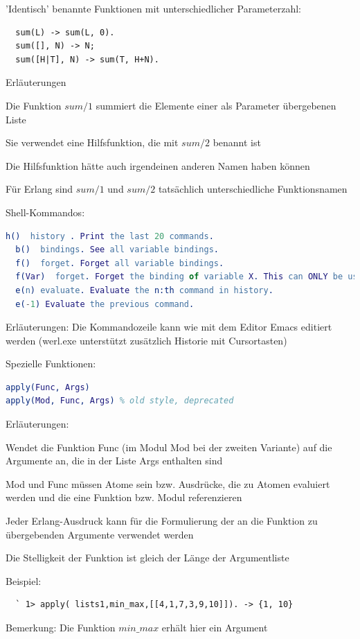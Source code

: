 \documentclass[10pt]{article}
\begin{document}
'Identisch' benannte Funktionen mit unterschiedlicher Parameterzahl:
\begin{lstlisting}
  sum(L) -> sum(L, 0).
  sum([], N) -> N;
  sum([H|T], N) -> sum(T, H+N).
\end{lstlisting}
\begin{itemize*}
  \item Erläuterungen
  \item Die Funktion $sum/1$ summiert die Elemente einer als Parameter übergebenen Liste
  \item Sie verwendet eine Hilfsfunktion, die mit $sum/2$ benannt ist
  \item Die Hilfsfunktion hätte auch irgendeinen anderen Namen haben können
  \item Für Erlang sind $sum/1$ und $sum/2$ tatsächlich unterschiedliche Funktionsnamen
\end{itemize*}

Shell-Kommandos:
\begin{lstlisting}[language=erlang]
  h()  history . Print the last 20 commands.
  b()  bindings. See all variable bindings.
  f()  forget. Forget all variable bindings.
  f(Var)  forget. Forget the binding of variable X. This can ONLY be used as a command to the shell - NOT in the body of a function!
  e(n) evaluate. Evaluate the n:th command in history.
  e(-1) Evaluate the previous command.
\end{lstlisting}
Erläuterungen: Die Kommandozeile kann wie mit dem Editor Emacs editiert werden (werl.exe unterstützt zusätzlich Historie mit Cursortasten)

Spezielle Funktionen:
\begin{lstlisting}[language=erlang]
apply(Func, Args)
apply(Mod, Func, Args) % old style, deprecated
\end{lstlisting}
\begin{itemize*}
  \item Erläuterungen:
  \item Wendet die Funktion Func (im Modul Mod bei der zweiten Variante) auf die Argumente an, die in der Liste Args enthalten sind
  \item Mod und Func müssen Atome sein bzw. Ausdrücke, die zu Atomen evaluiert werden und die eine Funktion bzw. Modul referenzieren
  \item Jeder Erlang-Ausdruck kann für die Formulierung der an die Funktion zu übergebenden Argumente verwendet werden
  \item Die Stelligkeit der Funktion ist gleich der Länge der Argumentliste
  \item Beispiel:
  \begin{lstlisting}
  ` 1> apply( lists1,min_max,[[4,1,7,3,9,10]]). -> {1, 10}
  \end{lstlisting}
  \item Bemerkung: Die Funktion $min\_max$ erhält hier ein Argument
\end{itemize*}
\end{document}
